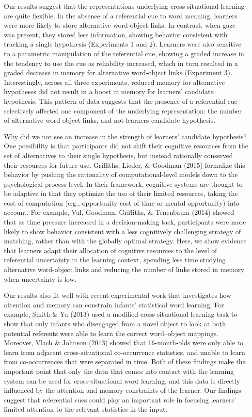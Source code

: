 \documentclass[a4paper,man,natbib]{apa6}
\begin{document}
Our results suggest that the representations underlying
cross-situational learning are quite flexible. In the absence of a
referential cue to word meaning, learners were more likely to store
alternative word-object links. In contrast, when gaze was present, they
stored less information, showing behavior consistent with tracking a
single hypothesis (Experiments 1 and 2). Learners were also sensitive to
a parametric manipulation of the referential cue, showing a graded
increase in the tendency to use the cue as reliability increased, which
in turn resulted in a graded decrease in memory for alternative
word-object links (Experiment 3). Interestingly, across all three
experiments, reduced memory for alternative hypotheses did not result in
a boost in memory for learners' candidate hypothesis. This pattern of
data suggests that the presence of a referential cue selectively
affected one component of the underlying representation: the number of
alternative word-object links, and not learners candidate hypothesis.

Why did we not see an increase in the strength of learners' candidate
hypothesis? One possibility is that participants did not shift their
cognitive resources from the set of alternatives to their single
hypothesis, but instead rationally conserved their resources for future
use. Griffiths, Lieder, \& Goodman (2015) formalize this behavior by
pushing the rationality of computational-level models down to the
psychological process level. In their framework, cognitive systems are
thought to be adaptive in that they optimize the use of their limited
resources, taking the cost of computation (e.g., opportunity cost of
time or mental opportunity) into account. For example, Vul, Goodman,
Griffiths, \& Tenenbaum (2014) showed that as time pressure increased in
a decision-making task, participants were more likely to show behavior
consistent with a less cognitively challenging strategy of matching,
rather than with the globally optimal strategy. Here, we show evidence
that learners adapt their allocation of cognitive resources to the level
of referential uncertainty in the learning context, spending less time
studying alternative word-object links and reducing the number of links
stored in memory when uncertainty is low.

Our results also fit well with recent experimental work that
investigates how attention and memory can constrain infants' statistical
word learning. For example, Smith \& Yu (2013) used a modified
cross-situational learning task to show that only infants who disengaged
from a novel object to look at both potential referents were able to
learn the correct word--object mappings. Moreover, Vlach \& Johnson
(2013) showed that 16-month-olds were only able to learn from adjacent
cross-situational co-occurrence statistics, and unable to learn from
co-occurrences that were separated in time. Both of these findings make
the important point that only the data that comes into contact with the
learning system can be used for cross-situational word learning, and
this data is directly influenced by the attention and memory constraints
of the learner. Our findings suggest that referential cues could play an
important role in focusing learners' limited attention to the relevant
statistics in the input.
\end{document}
